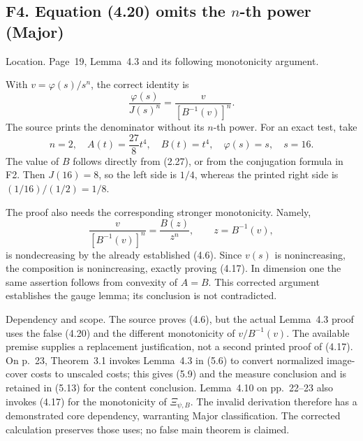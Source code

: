 \documentclass[10pt]{article}
\begin{document}
\subsection*{F4. Equation (4.20) omits the \(n\)-th power (Major)}
Location. Page 19, Lemma 4.3 and its following monotonicity argument.\par
With \(v=\varphi(s)/s^n\), the correct identity is \[\frac{\varphi(s)}{J(s)^n}
 =\frac{v}{[B^{-1}(v)]^n}.\] The source prints the denominator without its \(n\)-th power. For an exact test, take \[n=2,\quad A(t)=\frac{27}{8}t^4,\quad B(t)=t^4,\quad
 \varphi(s)=s,\quad s=16.\] The value of \(B\) follows directly from (2.27), or from the conjugation formula in F2. Then \(J(16)=8\), so the left side is \(1/4\), whereas the printed right side is \((1/16)/(1/2)=1/8\).\par
The proof also needs the corresponding stronger monotonicity. Namely, \[\frac{v}{[B^{-1}(v)]^n}=\frac{B(z)}{z^n},
 \qquad z=B^{-1}(v),\] is nondecreasing by the already established (4.6). Since \(v(s)\) is nonincreasing, the composition is nonincreasing, exactly proving (4.17). In dimension one the same assertion follows from convexity of \(A=B\). This corrected argument establishes the gauge lemma; its conclusion is not contradicted.\par
Dependency and scope. The source proves (4.6), but the actual Lemma 4.3 proof uses the false (4.20) and the different monotonicity of \(v/B^{-1}(v)\). The available premise supplies a replacement justification, not a second printed proof of (4.17). On p. 23, Theorem 3.1 invokes Lemma 4.3 in (5.6) to convert normalized image-cover costs to unscaled costs; this gives (5.9) and the measure conclusion and is retained in (5.13) for the content conclusion. Lemma 4.10 on pp. 22–23 also invokes (4.17) for the monotonicity of \(\Xi_{\psi,B}\). The invalid derivation therefore has a demonstrated core dependency, warranting Major classification. The corrected calculation preserves those uses; no false main theorem is claimed.\par
\end{document}
